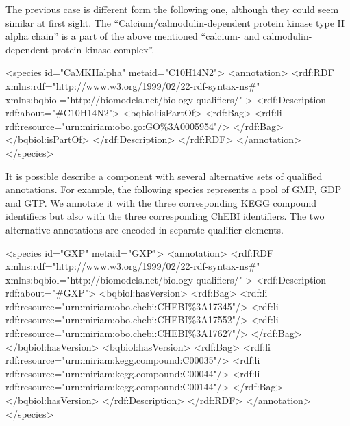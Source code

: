 The previous case is different form the following one, although they
could seem similar at first sight. The
``Calcium/calmodulin-dependent protein kinase type II alpha
chain'' is a part of the above mentioned ``calcium- and
calmodulin-dependent protein kinase complex''.

\begin{blockChanged}
\begin{example}
<species id="CaMKIIalpha" metaid="C10H14N2">
  <annotation>
    <rdf:RDF
      xmlns:rdf="http://www.w3.org/1999/02/22-rdf-syntax-ns\#"
      xmlns:bqbiol="http://biomodels.net/biology-qualifiers/"
    >
      <rdf:Description rdf:about="\#C10H14N2">
        <bqbiol:isPartOf>
          <rdf:Bag>
            <rdf:li rdf:resource="urn:miriam:obo.go:GO\%3A0005954"/>
          </rdf:Bag>
        </bqbiol:isPartOf>
      </rdf:Description>
    </rdf:RDF>
  </annotation>
</species>
\end{example}
\end{blockChanged}

It is possible describe a component with several alternative sets
of qualified annotations. For example, the following species
represents a pool of  GMP, GDP and GTP. We annotate it with the
three corresponding KEGG compound identifiers but also with the
three corresponding ChEBI identifiers.  The two alternative
annotations are encoded in separate  qualifier
elements.

\begin{blockChanged}
\begin{example}
<species id="GXP" metaid="GXP">
  <annotation>
    <rdf:RDF
      xmlns:rdf="http://www.w3.org/1999/02/22-rdf-syntax-ns\#"
      xmlns:bqbiol="http://biomodels.net/biology-qualifiers/"
    >
      <rdf:Description rdf:about="\#GXP">
        <bqbiol:hasVersion>
          <rdf:Bag>
            <rdf:li rdf:resource="urn:miriam:obo.chebi:CHEBI\%3A17345"/>
            <rdf:li rdf:resource="urn:miriam:obo.chebi:CHEBI\%3A17552"/>
            <rdf:li rdf:resource="urn:miriam:obo.chebi:CHEBI\%3A17627"/>
          </rdf:Bag>
        </bqbiol:hasVersion>
        <bqbiol:hasVersion>
          <rdf:Bag>
            <rdf:li rdf:resource="urn:miriam:kegg.compound:C00035"/>
            <rdf:li rdf:resource="urn:miriam:kegg.compound:C00044"/>
            <rdf:li rdf:resource="urn:miriam:kegg.compound:C00144"/>
          </rdf:Bag>
        </bqbiol:hasVersion>
      </rdf:Description>
    </rdf:RDF>
  </annotation>
</species>
\end{example}
\end{blockChanged}

